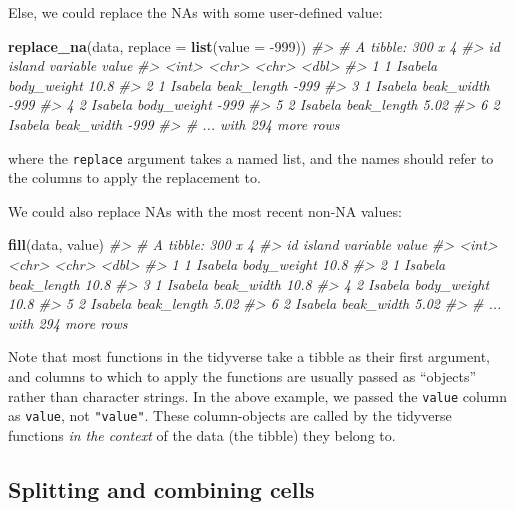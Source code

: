 \documentclass[]{book}
\newenvironment{Shaded}{}{}
\newcommand{\CommentTok}[1]{\textcolor[rgb]{0.38,0.63,0.69}{\textit{#1}}}
\newcommand{\DataTypeTok}[1]{\textcolor[rgb]{0.56,0.13,0.00}{#1}}
\newcommand{\DecValTok}[1]{\textcolor[rgb]{0.25,0.63,0.44}{#1}}
\newcommand{\KeywordTok}[1]{\textcolor[rgb]{0.00,0.44,0.13}{\textbf{#1}}}
\newcommand{\NormalTok}[1]{#1}
\begin{document}
Else, we could replace the NAs with some user-defined value:

\begin{Shaded}
\begin{Highlighting}[]
\KeywordTok{replace_na}\NormalTok{(data, }\DataTypeTok{replace =} \KeywordTok{list}\NormalTok{(}\DataTypeTok{value =} \DecValTok{-999}\NormalTok{))}
\CommentTok{#> # A tibble: 300 x 4}
\CommentTok{#>      id island  variable      value}
\CommentTok{#>   <int> <chr>   <chr>         <dbl>}
\CommentTok{#> 1     1 Isabela body_weight   10.8 }
\CommentTok{#> 2     1 Isabela beak_length -999   }
\CommentTok{#> 3     1 Isabela beak_width  -999   }
\CommentTok{#> 4     2 Isabela body_weight -999   }
\CommentTok{#> 5     2 Isabela beak_length    5.02}
\CommentTok{#> 6     2 Isabela beak_width  -999   }
\CommentTok{#> # ... with 294 more rows}
\end{Highlighting}
\end{Shaded}

where the \texttt{replace} argument takes a named list, and the names should refer to the columns to apply the replacement to.

We could also replace NAs with the most recent non-NA values:

\begin{Shaded}
\begin{Highlighting}[]
\KeywordTok{fill}\NormalTok{(data, value)}
\CommentTok{#> # A tibble: 300 x 4}
\CommentTok{#>      id island  variable    value}
\CommentTok{#>   <int> <chr>   <chr>       <dbl>}
\CommentTok{#> 1     1 Isabela body_weight 10.8 }
\CommentTok{#> 2     1 Isabela beak_length 10.8 }
\CommentTok{#> 3     1 Isabela beak_width  10.8 }
\CommentTok{#> 4     2 Isabela body_weight 10.8 }
\CommentTok{#> 5     2 Isabela beak_length  5.02}
\CommentTok{#> 6     2 Isabela beak_width   5.02}
\CommentTok{#> # ... with 294 more rows}
\end{Highlighting}
\end{Shaded}

Note that most functions in the tidyverse take a tibble as their first argument, and columns to which to apply the functions are usually passed as ``objects'' rather than character strings. In the above example, we passed the \texttt{value} column as \texttt{value}, not \texttt{"value"}. These column-objects are called by the tidyverse functions \emph{in the context} of the data (the tibble) they belong to.

\hypertarget{splitting-and-combining-cells}{%
\subsection{Splitting and combining cells}\label{splitting-and-combining-cells}}
\end{document}
